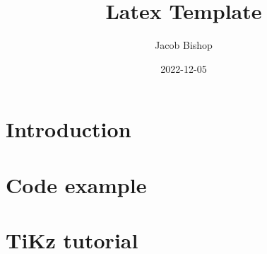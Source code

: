 \documentclass{article}
\title{Latex Template}
\author{Jacob Bishop}
\date{2022-12-05}
\begin{document}
\maketitle

\section{Introduction}

\newpage

\section{Code example}

\newpage

\section{TiKz tutorial}


\end{document}
